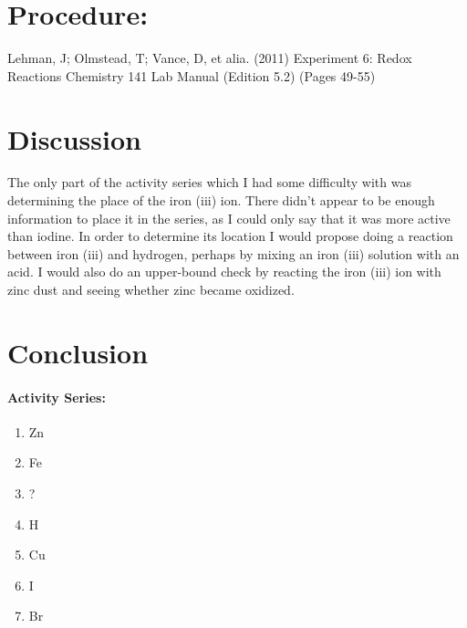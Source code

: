 \documentclass[11pt,letterpaper]{report}
\begin{document}
 



\section*{Procedure:}
Lehman, J; Olmstead, T; Vance, D, et alia. (2011)
Experiment 6: Redox Reactions
Chemistry 141 Lab Manual (Edition 5.2) (Pages 49-55)


\section*{Discussion}
The only part of the activity series which I had some difficulty with was determining the place of the iron (iii) ion. There didn't appear to be enough information to place it in the series, as I could only say that it was more active than iodine. In order to determine its location I would propose doing a reaction between iron (iii) and hydrogen, perhaps by mixing an iron (iii) solution with an acid. I would also do an upper-bound check by reacting the iron (iii) ion with zinc dust and seeing whether zinc became oxidized.

\section*{Conclusion}
\paragraph{Activity Series:}
\begin{enumerate}
\item Zn \\[-0.5cm]
\item Fe \\[-0.5cm]
\item {} ? \\[-0.5cm]
\item H \\[-0.5cm]
\item Cu \\[-0.5cm]
\item I \\[-0.5cm]
\item Br \\[-0.5cm]
\end{enumerate}
\end{document}
